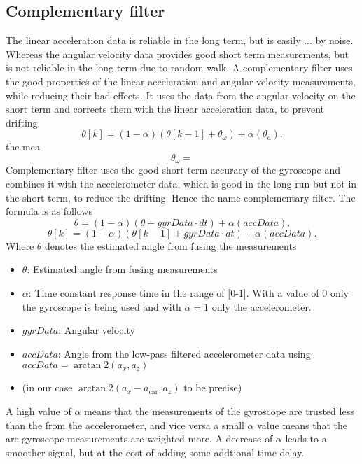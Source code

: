 \subsection{Complementary filter}
The linear acceleration data is reliable in the long term, but is easily ... by noise.
Whereas the angular velocity data provides good short term measurements, but is not reliable in the long term due to random walk.
A complementary filter uses the good properties of the linear acceleration and angular velocity measurements, while reducing their bad effects.
It uses the data from the angular velocity on the short term and corrects them with the linear acceleration data, to prevent drifting.
\begin{equation}
    \theta[k] = (1-\alpha)(\theta[k-1] + \theta_\omega) + \alpha(\theta_a).
\end{equation}
the mea
\begin{equation}
    \theta_\omega =
\end{equation}
Complementary filter uses the good short term accuracy of the gyroscope and combines it with the accelerometer data, which is good in the long run but not in the short term, to reduce the drifting.
Hence the name complementary filter. The formula is as follows
\begin{equation}
    \theta = (1-\alpha)(\theta + gyrData\cdot dt) + \alpha(accData).
\end{equation}
\begin{equation}
    \theta[k] = (1-\alpha)(\theta[k-1] + gyrData\cdot dt) + \alpha(accData).
\end{equation}
Where $\theta$ denotes the estimated angle from fusing the measurements
\begin{itemize}
    \item $\theta$: Estimated angle from fusing measurements
    \item $\alpha$: Time constant response time in the range of [0-1]. With a value of 0 only the gyroscope is being used and with $\alpha=1$ only the accelerometer.
    \item $gyrData$: Angular velocity
    \item $accData$: Angle from the low-pass filtered accelerometer data using $accData = \arctan2(a_x, a_z)$
        \item (in our case $\arctan2(a_x-a_\mathrm{car}, a_z)$ to be precise)
\end{itemize}

A high value of $\alpha$ means that the measurements of the gyroscope are trusted less than the from the accelerometer, and vice versa a small $\alpha$ value means that the are gyroscope measurements are weighted more.
A decrease of $\alpha$ leads to a smoother signal, but at the cost of adding some addtional time delay.


